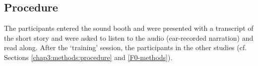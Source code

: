 \subsection{Procedure}

The participants entered the sound booth and were presented with a transcript of the short story and were asked to listen to the audio (ear-recorded narration) and read along.  After the `training' session, the participants \DIFdelbegin {}\DIFdelend \DIFaddbegin {}\DIFaddend in the other studies (cf. Sections \ref{chap3:methods:procedure} and \ref{F0-methods}).





\DIFdelbegin %






